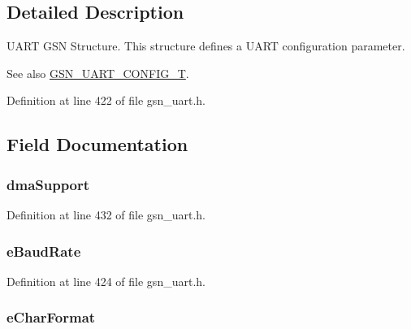 \subsection{Detailed Description}
UART GSN Structure. This structure defines a UART configuration parameter. 

\begin{DoxySeeAlso}{See also}
\hyperlink{a00656_gab793201a4cc37e8cf27b0b640b1f37bc}{GSN\_\-UART\_\-CONFIG\_\-T}. 
\end{DoxySeeAlso}


Definition at line 422 of file gsn\_\-uart.h.



\subsection{Field Documentation}
\hypertarget{a00268_a528c61545e39ea28f9a468044a298376}{
\subsubsection[{dmaSupport}]{ {\bf dmaSupport}}}
\label{a00268_a528c61545e39ea28f9a468044a298376}


Definition at line 432 of file gsn\_\-uart.h.

\hypertarget{a00268_acdfb4b214b0eddcf1abc92316a1ed6d1}{
\subsubsection[{eBaudRate}]{ {\bf eBaudRate}}}
\label{a00268_acdfb4b214b0eddcf1abc92316a1ed6d1}


Definition at line 424 of file gsn\_\-uart.h.

\hypertarget{a00268_a29549d5b2f7fbee09dd3f8b0c5632ebc}{
\subsubsection[{eCharFormat}]{ {\bf eCharFormat}}}
\label{a00268_a29549d5b2f7fbee09dd3f8b0c5632ebc}


